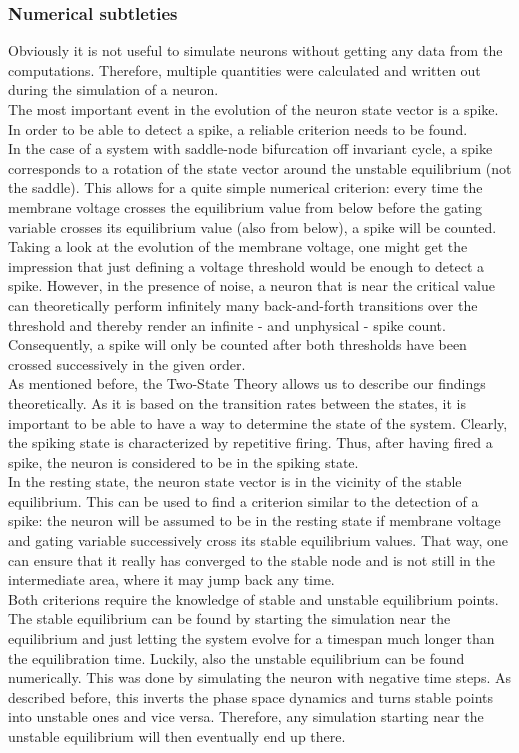 \documentclass[12pt,a4paper]{article}
\begin{document}
\subsubsection{Numerical subtleties}
Obviously it is not useful to simulate neurons without getting any data from the computations. Therefore, multiple quantities were calculated and written out during the simulation of a neuron. \\
The most important event in the evolution of the neuron state vector is a spike. In order to be able to detect a spike, a reliable criterion needs to be found.\\
In the case of a system with saddle-node bifurcation off invariant cycle, a spike corresponds to a rotation of the state vector around the unstable equilibrium (not the saddle). This allows for a quite simple numerical criterion: every time the membrane voltage crosses the equilibrium value from below before the gating variable crosses its equilibrium value (also from below), a spike will be counted. Taking a look at the evolution of the membrane voltage, one might get the impression that just defining a voltage threshold would be enough to detect a spike. However, in the presence of noise, a neuron that is near the critical value can theoretically perform infinitely many back-and-forth transitions over the threshold and thereby render an infinite - and unphysical - spike count. Consequently, a spike will only be counted after both thresholds have been crossed successively in the given order.\\
As mentioned before, the Two-State Theory allows us to describe our findings theoretically. As it is based on the transition rates between the states, it is important to be able to have a way to determine the state of the system. Clearly, the spiking state is characterized by repetitive firing. Thus, after having fired a spike, the neuron is considered to be in the spiking state. \\
In the resting state, the neuron state vector is in the vicinity of the stable equilibrium. This can be used to find a criterion similar to the detection of a spike: the neuron will be assumed to be in the resting state if membrane voltage and gating variable successively cross its stable equilibrium values. That way, one can ensure that it really has converged to the stable node and is not still in the intermediate area, where it may jump back any time. \\
Both criterions require the knowledge of stable and unstable equilibrium points. The stable equilibrium can be found by starting the simulation near the equilibrium and just letting the system evolve for a timespan much longer than the equilibration time. Luckily, also the unstable equilibrium can be found numerically. This was done by simulating the neuron with negative time steps. As described before, this inverts the phase space dynamics and turns stable points into unstable ones and vice versa. Therefore, any simulation starting near the unstable equilibrium will then eventually end up there.
\end{document}
